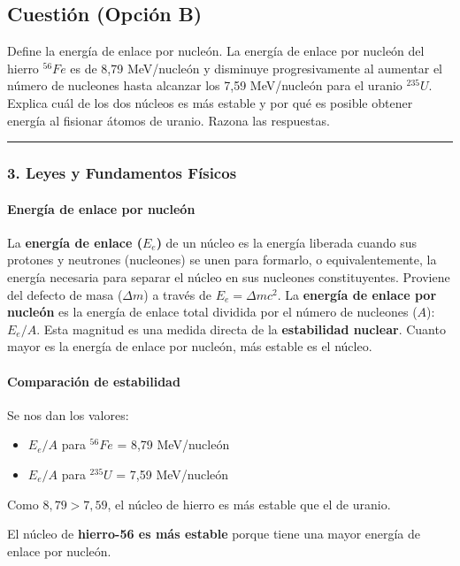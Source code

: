 \newpage

\subsection{Cuestión (Opción B)}
\label{subsec:B6_2016_jun_ord_re}

\begin{cajaenunciado}
Define la energía de enlace por nucleón. La energía de enlace por nucleón del hierro ${}^{56}Fe$ es de 8,79 MeV/nucleón y disminuye progresivamente al aumentar el número de nucleones hasta alcanzar los 7,59 MeV/nucleón para el uranio ${}^{235}U$. Explica cuál de los dos núcleos es más estable y por qué es posible obtener energía al fisionar átomos de uranio. Razona las respuestas.
\end{cajaenunciado}
\hrule

\subsubsection*{3. Leyes y Fundamentos Físicos}
\paragraph{Energía de enlace por nucleón}
La \textbf{energía de enlace ($E_e$)} de un núcleo es la energía liberada cuando sus protones y neutrones (nucleones) se unen para formarlo, o equivalentemente, la energía necesaria para separar el núcleo en sus nucleones constituyentes. Proviene del defecto de masa ($\Delta m$) a través de $E_e = \Delta m c^2$.
La \textbf{energía de enlace por nucleón} es la energía de enlace total dividida por el número de nucleones ($A$): $E_e/A$. Esta magnitud es una medida directa de la \textbf{estabilidad nuclear}. Cuanto mayor es la energía de enlace por nucleón, más estable es el núcleo.

\paragraph{Comparación de estabilidad}
Se nos dan los valores:
\begin{itemize}
    \item $E_e/A$ para ${}^{56}Fe$ = 8,79 MeV/nucleón
    \item $E_e/A$ para ${}^{235}U$ = 7,59 MeV/nucleón
\end{itemize}
Como $8,79 > 7,59$, el núcleo de hierro es más estable que el de uranio.
\begin{cajaresultado}
El núcleo de \textbf{hierro-56 es más estable} porque tiene una mayor energía de enlace por nucleón.
\end{cajaresultado}

